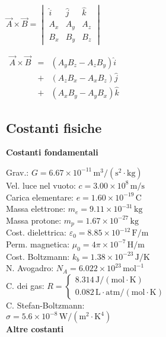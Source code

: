 \documentclass[10pt]{article}
\begin{document}
\begin{multicols}{3}
$\vec A \times \vec B = \begin{vmatrix}
\hat i  &  \hat j  & \hat k \\
A_x     &   A_y    &  A_z \\
B_x     &   B_y    &  B_z
\end{vmatrix}$

$ \begin{matrix}
\vec A \times \vec B  & = & (A_yB_z - A_zB_y)\hat i  \\
 & + & (A_zB_x - A_xB_z)\hat j  \\
 & + & (A_xB_y - A_yB_x) \hat k
\end{matrix}$

\setlength{\parindent}{0pt} 

\subsection*{Costanti fisiche}

\textbf{Costanti fondamentali}

Grav.: $G = 6.67\times 10^{-11}\,\mathrm{m^3/(s^2\cdot kg)}$\\
Vel. luce nel vuoto: $c = 3.00\times 10^8\,\mathrm{m/s}$\\
Carica elementare: $e = 1.60\times 10^{-19}\,\mathrm{C}$\\
Massa elettrone: $m_e = 9.11\times 10^{-31}\,\mathrm{kg}$\\
Massa protone: $m_p = 1.67\times 10^{-27}\,\mathrm{kg}$\\
Cost. dielettrica: $\varepsilon_0 = 8.85\times 10^{-12}\,\mathrm{F/m}$\\
Perm. magnetica:  $\mu_0 = 4\pi\times 10^{-7}\,\mathrm{H/m}$\\
Cost. Boltzmann: $k_b = 1.38 \times 10^{-23}\,\mathrm{J/K}$\\
N. Avogadro: $N_A = 6.022 \times 10^{23}\,\mathrm{mol^{-1}}$\\
C. dei gas: $ R = \left\{ \begin{matrix} 8.314 \,\mathrm{J / (mol \cdot K)} \\
0.082 \,\mathrm{L\cdot atm / (mol \cdot K)} \end{matrix}\right.$\\
C. Stefan-Boltzmann: \\ 
\phantom{aaaaaaa}    $  \sigma = 5.6 \times 10^{-8} \,\mathrm{W/(m^2 \cdot K^4)}$\\

\textbf{Altre costanti}


\end{multicols}
\end{document}
